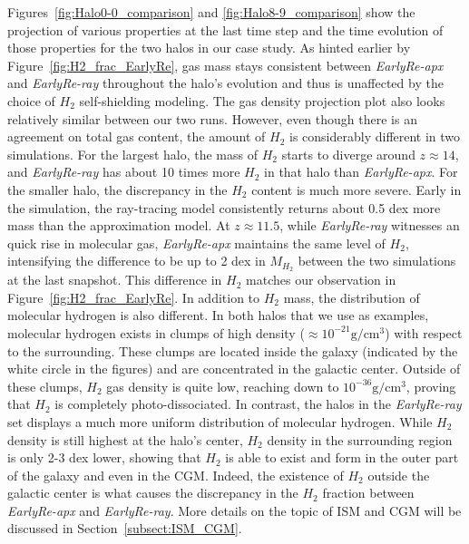 \documentclass[linenumbers, twocolumn]{aastex631}
\begin{document}
Figures~\ref{fig:Halo0-0_comparison} and \ref{fig:Halo8-9_comparison} show the projection of various properties at the last time step and the time evolution of those properties for the two halos in our case study. As hinted earlier by Figure~\ref{fig:H2_frac_EarlyRe}, gas mass stays consistent between \textit{EarlyRe-apx} and \textit{EarlyRe-ray} throughout the halo's evolution and thus is unaffected by the choice of $H_{2}$ self-shielding modeling. The gas density projection plot also looks relatively similar between our two runs. However, even though there is an agreement on total gas content, the amount of $H_{2}$ is considerably different in two simulations. For the largest halo, the mass of $H_{2}$ starts to diverge around $z \approx 14$, and \textit{EarlyRe-ray} has about 10 times more $H_{2}$ in that halo than \textit{EarlyRe-apx}. For the smaller halo, the discrepancy in the $H_{2}$ content is much more severe. Early in the simulation, the ray-tracing model consistently returns about 0.5 dex more mass than the approximation model. At $z \approx 11.5$, while \textit{EarlyRe-ray} witnesses an quick rise in molecular gas, \textit{EarlyRe-apx} maintains the same level of $H_{2}$, intensifying the difference to be up to 2 dex in $M_{H_{2}}$ between the two simulations at the last snapshot. This difference in $H_{2}$ matches our observation in Figure~\ref{fig:H2_frac_EarlyRe}. In addition to $H_{2}$ mass, the distribution of molecular hydrogen is also different. In both halos that we use as examples, molecular hydrogen exists in clumps of high density ($\approx 10^{-21} \mathrm{g}/\mathrm{cm}^{3}$) with respect to the surrounding. These clumps are located inside the galaxy (indicated by the white circle in the figures) and are concentrated in the galactic center. Outside of these clumps, $H_{2}$ gas density is quite low, reaching down to $10^{-36} \mathrm{g}/\mathrm{cm}^{3}$, proving that $H_{2}$ is completely photo-dissociated. In contrast, the halos in the \textit{EarlyRe-ray} set displays a much more uniform distribution of molecular hydrogen. While $H_{2}$ density is still highest at the halo's center, $H_{2}$ density in the surrounding region is only 2-3 dex lower, showing that $H_{2}$ is able to exist and form in the outer part of the galaxy and even in the CGM. Indeed, the existence of $H_{2}$ outside the galactic center is what causes the discrepancy in the $H_{2}$ fraction between \textit{EarlyRe-apx} and \textit{EarlyRe-ray}. More details on the topic of ISM and CGM will be discussed in Section~\ref{subsect:ISM_CGM}.
\end{document}
